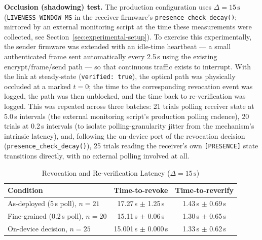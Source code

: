 \documentclass[conference]{IEEEtran}
\begin{document}
\textbf{Occlusion (shadowing) test.} The production configuration uses $\Delta = 15\,\text{s}$ (\texttt{LIVENESS\_WINDOW\_MS} in the receiver firmware's \texttt{presence\_check\_decay()}; mirrored by an external monitoring script at the time these measurements were collected, see Section~\ref{sec:experimental-setup}). To exercise this experimentally, the sender firmware was extended with an idle-time heartbeat — a small authenticated frame sent automatically every 2.5\,s using the existing encrypt/frame/send path — so that continuous traffic exists to interrupt. With the link at steady-state (\texttt{verified: true}), the optical path was physically occluded at a marked $t=0$; the time to the corresponding revocation event was logged, the path was then unblocked, and the time back to re-verification was logged. This was repeated across three batches: 21 trials polling receiver state at 5.0\,s intervals (the external monitoring script's production polling cadence), 20 trials at 0.2\,s intervals (to isolate polling-granularity jitter from the mechanism's intrinsic latency), and, following the on-device port of the revocation decision (\texttt{presence\_check\_decay()}), 25 trials reading the receiver's own \texttt{[PRESENCE]} state transitions directly, with no external polling involved at all.

\begin{table}[htbp]
\caption{Revocation and Re-verification Latency ($\Delta = 15\,\text{s}$)}
\begin{center}
\small
\begin{tabular}{|l|c|c|}
\hline
\textbf{Condition} & \textbf{Time-to-revoke} & \textbf{Time-to-reverify} \\
\hline
As-deployed (5\,s poll), $n{=}21$ & 17.27\,s $\pm$ 1.25\,s & 1.43\,s $\pm$ 0.69\,s \\
\hline
Fine-grained (0.2\,s poll), $n{=}20$ & 15.11\,s $\pm$ 0.06\,s & 1.30\,s $\pm$ 0.65\,s \\
\hline
On-device decision, $n{=}25$ & 15.001\,s $\pm$ 0.000\,s & 1.33\,s $\pm$ 0.62\,s \\
\hline
\end{tabular}
\label{tab:revocation_latency}
\end{center}
\end{table}
\end{document}
